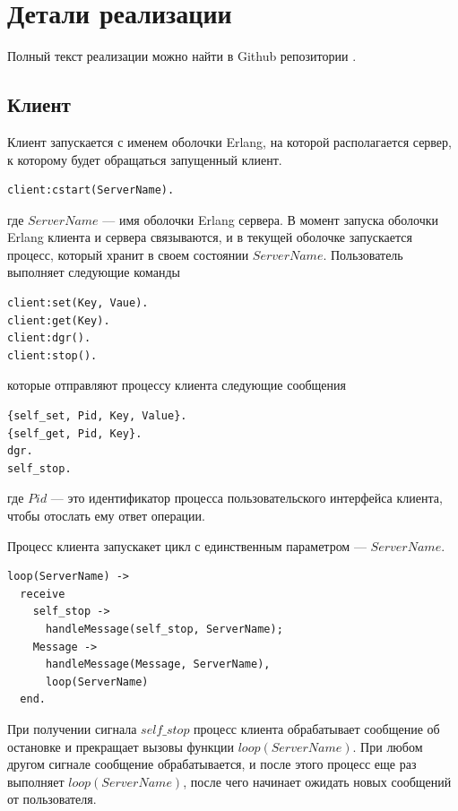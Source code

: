 \newpage

\chapter{Детали реализации}
	Полный текст реализации можно найти в Github репозитории \cite{dgr}.

	\section{Клиент}
		Клиент запускается с именем оболочки Erlang, на которой располагается сервер, к которому будет обращаться запущенный клиент.
		\begin{lstlisting}
client:cstart(ServerName).			
		\end{lstlisting}
		где $ServerName$ --- имя оболочки Erlang сервера. В момент запуска оболочки Erlang клиента и сервера связываются, и в текущей оболочке запускается процесс,
		который хранит в своем состоянии $ServerName$. Пользователь выполняет следующие команды
		\begin{lstlisting}
client:set(Key, Vaue).			
client:get(Key).			
client:dgr().			
client:stop().			
		\end{lstlisting}
		которые отправляют процессу клиента следующие сообщения
		\begin{lstlisting}
{self_set, Pid, Key, Value}.			
{self_get, Pid, Key}.			
dgr.			
self_stop.			
		\end{lstlisting}	
		где $Pid$ --- это идентификатор процесса пользовательского интерфейса клиента, чтобы отослать ему ответ операции. 
		
		Процесс клиента запускакет цикл с единственным параметром --- $ServerName$. 
		\begin{lstlisting}
loop(ServerName) -> 
  receive
    self_stop ->
      handleMessage(self_stop, ServerName);
    Message -> 
      handleMessage(Message, ServerName), 
      loop(ServerName)
  end.
		\end{lstlisting}
		При получении сигнала $self\_stop$ процесс клиента обрабатывает сообщение об остановке и прекращает вызовы функции $loop(ServerName)$. При любом другом сигнале 
		сообщение обрабатывается, и после этого процесс еще раз выполняет $loop(ServerName)$, после чего начинает ожидать новых сообщений от пользователя.


